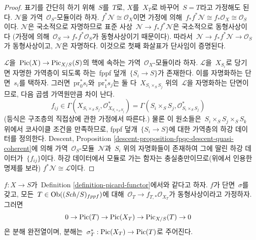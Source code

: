 \begin{proof}
표기를 간단히 하기 위해\  $S$를\  $T$로, $X$를\  $X_T$로 바꾸어\ 
$S = T$라고 가정해도 된다. $\mathcal{N}$을 가역\ 
$\mathcal{O}_S$-모듈이라 하자. $f^*\mathcal{N} \cong \mathcal{O}_X$이면
가정에 의해\ 
$f_*f^*\mathcal{N} \cong f_*\mathcal{O}_X \cong \mathcal{O}_S$이다.
$\mathcal{N}$은 국소적으로 자명하므로 표준 사상\ 
$\mathcal{N} \to f_*f^*\mathcal{N}$은 국소적으로 동형사상이다
(가정에 의해\  $\mathcal{O}_S \to f_*f^*\mathcal{O}_S$가 동형사상이기
때문이다). 따라서\ 
$\mathcal{N} \to f_*f^*\mathcal{N} \to \mathcal{O}_S$가 동형사상이고,
$\mathcal{N}$은 자명하다. 이것으로 첫째 화살표가 단사임이 증명된다.

\medskip\noindent
$\mathcal{L}$을\  $\mathop{\mathrm{Pic}}\nolimits(X) \to \mathrm{Pic}_{X/S}(S)$의 핵에 속하는 가역\ 
$\mathcal{O}_X$-모듈이라 하자. $\mathcal{L}$을\  $X_{S_i}$로 당기면 자명한
가역층이 되도록 하는\  fppf 덮개\  $\{S_i \to S\}$가 존재한다. 이를 자명화하는
단면\  $s_i$를 택하자. 그러면\  $\text{pr}_0^*s_i$와\ 
$\text{pr}_1^*s_j$는 둘 다\  $X_{S_i \times_S S_j}$ 위의\  $\mathcal{L}$을
자명화하는 단면이므로, 다음 곱셈 가역원만큼 차이 난다.
$$
f_{ij} \in
\Gamma(X_{S_i \times_S S_j}, \mathcal{O}_{X_{S_i \times_S S_j}}^*) =
\Gamma(S_i \times_S S_j, \mathcal{O}_{S_i \times_S S_j}^*)
$$
(등식은 구조층의 직접상에 관한 가정에서 따른다.) 물론 이 원소들은\ 
$S_i \times_S S_j \times_S S_k$ 위에서 코사이클 조건을 만족하므로,
fppf 덮개\  $\{S_i \to S\}$에 대한 가역층의 하강 데이터를 정의한다.
Descent, Proposition \ref{descent-proposition-fpqc-descent-quasi-coherent}에
의해 가역\  $\mathcal{O}_S$-모듈\  $\mathcal{N}$과\  $S_i$ 위의 자명화들이
존재하여 그에 딸린 하강 데이터가\  $\{f_{ij}\}$이다. 하강 데이터에서
모듈로 가는 함자는 충실충만이므로(위에서 인용한 명제를 보라)
$f^*\mathcal{N} \cong \mathcal{L}$이다.
\end{proof}

\begin{lemma}
\label{lemma-flat-geometrically-connected-fibres-with-section}
$f : X \to S$가\  Definition \ref{definition-picard-functor}에서와 같다고 하자.
$f$가 단면\  $\sigma$를 갖고, 모든\  $T \in \mathop{\mathrm{Ob}}\nolimits((\mathit{Sch}/S)_{fppf})$에 대해\ 
$\mathcal{O}_T \to f_{T, *}\mathcal{O}_{X_T}$가 동형사상이라고 가정하자.
그러면
$$
0 \to \mathop{\mathrm{Pic}}\nolimits(T) \to \mathop{\mathrm{Pic}}\nolimits(X_T) \to \mathrm{Pic}_{X/S}(T) \to 0
$$
은 분해 완전열이며, 분해는\ 
$\sigma_T^* : \mathop{\mathrm{Pic}}\nolimits(X_T) \to \mathop{\mathrm{Pic}}\nolimits(T)$로 주어진다.
\end{lemma}

